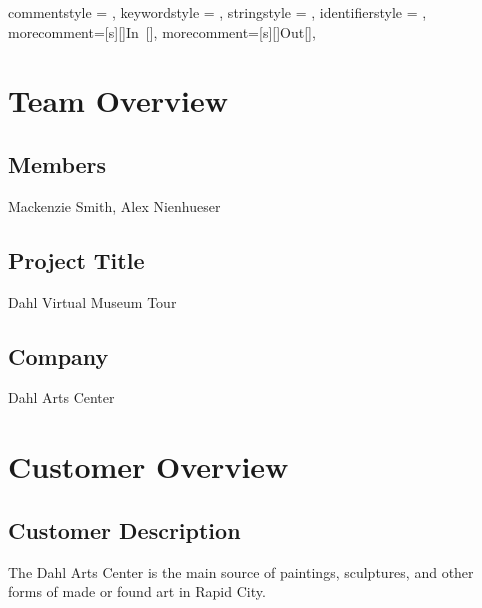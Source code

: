 



 {
commentstyle = \color{black},
keywordstyle = \color{black},
stringstyle = \color{black},
identifierstyle = \color{black},
morecomment=[s][\color{blue}]{In\ [}{]\:},
morecomment=[s][\color{red}]{Out[}{]\:},
 }

\pagestyle{empty}

\renewcommand{\familydefault}{\sfdefault}




\section*{Team Overview}
\hrulefill
\subsection*{Members}
Mackenzie Smith, Alex Nienhueser

\subsection*{Project Title}
Dahl Virtual Museum Tour

\subsection*{Company}
Dahl Arts Center

\section*{Customer Overview}
\hrulefill
\subsection*{Customer Description}
The Dahl Arts Center is the main source of paintings, sculptures, and other forms of made or found art in Rapid City.

